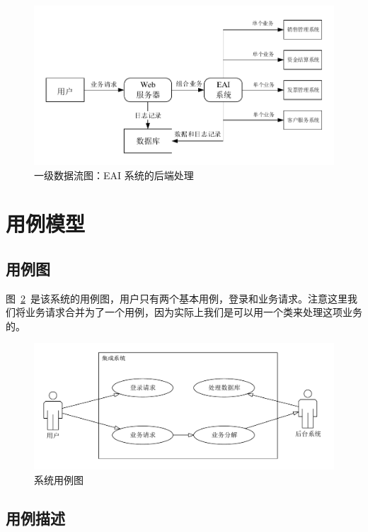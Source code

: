 \documentclass[cs4size,a4paper,nofonts]{ctexart}
\begin{document}
\begin{figure}[htp]
\includegraphics[width=\textwidth,page=3]{images/dfd.pdf}
\caption{\label{dfd1.2}一级数据流图：EAI 系统的后端处理}
\end{figure}

\section{用例模型}

\subsection{用例图}

图~\ref{uc1}~是该系统的用例图，用户只有两个基本用例，登录和业务请求。注意这里我们将业务请求合并为了一个用例，因为实际上我们是可以用一个类来处理这项业务的。

\begin{figure}[htp]
\includegraphics[width=\textwidth,page=1]{images/ucs.pdf}
\caption{\label{uc1}系统用例图}
\end{figure}

\subsection{用例描述}
\end{document}
